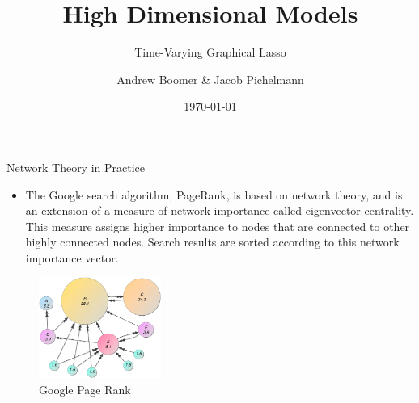 \documentclass{beamer}
\title[High Dimensional Models] %
{High Dimensional Models}
\subtitle{Time-Varying Graphical Lasso}
\author[Andrew Boomer \& Jacob Pichelmann] %
{Andrew Boomer \& Jacob Pichelmann}
\institute []
{Toulouse School of Economics \\ M2 EEE}
\date{\today}
\begin{document}
\frame{\titlepage}

\begin{frame}{Network Theory in Practice \cite{page1999pagerank}}
	\begin{itemize}
		\item The Google search algorithm, PageRank, is based on network theory, and is an extension of a measure of network
        importance called eigenvector centrality.
        This measure assigns higher importance to nodes that are connected to other highly connected nodes.
        Search results are sorted according to this network importance vector.
	\end{itemize}

        \begin{figure}
       \includegraphics[width=4cm]{PageRankExample}
       \caption{Google Page Rank}
       \label{fig:PageRank}
  \end{figure}
\end{frame}
    
\end{document}
